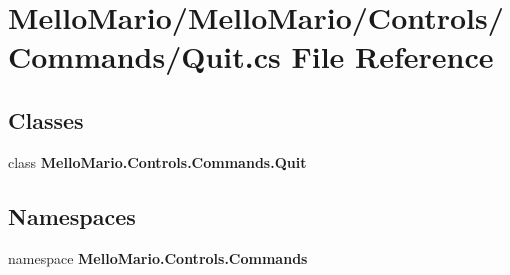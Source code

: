 \section{Mello\+Mario/\+Mello\+Mario/\+Controls/\+Commands/\+Quit.cs File Reference}
\label{Quit_8cs}
\subsection*{Classes}
\begin{DoxyCompactItemize}
\item 
class \textbf{ Mello\+Mario.\+Controls.\+Commands.\+Quit}
\end{DoxyCompactItemize}
\subsection*{Namespaces}
\begin{DoxyCompactItemize}
\item 
namespace \textbf{ Mello\+Mario.\+Controls.\+Commands}
\end{DoxyCompactItemize}
